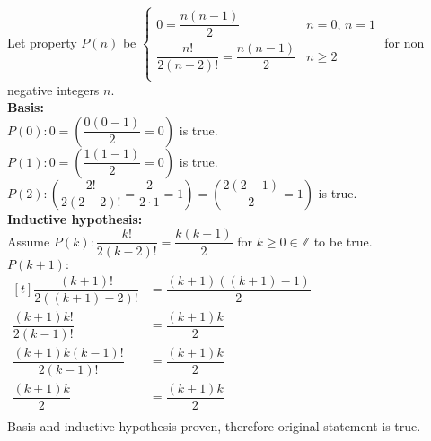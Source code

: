 \documentclass[letterpaper,fleqn,leqno]{article}
\begin{document}
\begin{enumerate}[(a)]
{			Let property $P(n)$ be $\begin{cases}
				0=\dfrac{n(n-1)}{2} & n=0,\, n=1 \\
				\dfrac{n!}{2(n-2)!}=\dfrac{n(n-1)}{2} & n\geq2 \\
			\end{cases}$ for non negative integers $n$. \\
			\textbf{Basis:} \\
			$P(0):0=\left(\dfrac{0(0-1)}{2}=0\right)$ is true. \\
			$P(1):0=\left(\dfrac{1(1-1)}{2}=0\right)$ is true. \\
			$P(2): \left(\dfrac{2!}{2(2-2)!}=\dfrac{2}{2\cdot1}=1\right)=\left(\dfrac{2(2-1)}{2}=1\right)$ is true. \\
			\textbf{Inductive hypothesis:} \\
			Assume $P(k): \dfrac{k!}{2(k-2)!}=\dfrac{k(k-1)}{2}$ for $k\geq0\in\mathbb{Z}$ to be true. \\
			$P(k+1):$ \\
			$\begin{aligned}[t]
				\dfrac{(k+1)!}{2((k+1)-2)!} &= \dfrac{(k+1)((k+1)-1)}{2} \\
				\dfrac{(k+1)k!}{2(k-1)!} &= \dfrac{(k+1)k}{2} \\
				\dfrac{(k+1)k(k-1)!}{2(k-1)!} &= \dfrac{(k+1)k}{2} \\
				\dfrac{(k+1)k}{2} &= \dfrac{(k+1)k}{2} \\
			\end{aligned}$ \\
			Basis and inductive hypothesis proven, therefore original statement is true. \\
		}
\end{enumerate}
\end{document}
